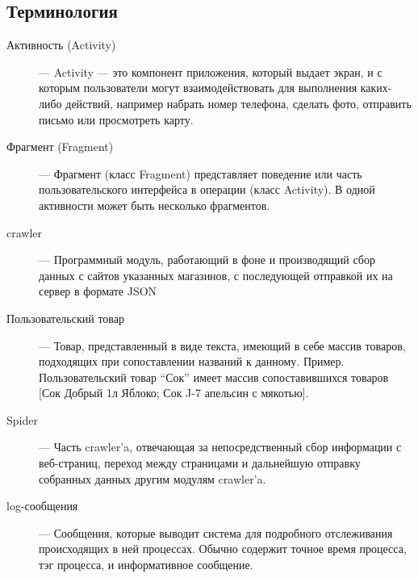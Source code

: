 \subsection{Терминология}
\begin{description}
    \item[Активность (Activity)] ---
        Activity — это компонент приложения, который выдает экран, и с которым
        пользователи могут взаимодействовать для выполнения каких-либо
        действий, например набрать номер телефона, сделать фото, отправить
        письмо или просмотреть карту. 

    \item[Фрагмент (Fragment)] ---
        Фрагмент (класс Fragment) представляет поведение или часть
        пользовательского интерфейса в операции (класс Activity). В одной
        активности может быть несколько фрагментов.

    \item[crawler] ---
            Программный модуль, работающий в фоне и производящий сбор данных с сайтов
            указанных магазинов, с последующей отправкой их на сервер в формате
            JSON

    \item[Пользовательский товар] ---
            Товар, представленный в виде текста, имеющий в себе массив товаров,
            подходящих при сопоставлении названий к данному. Пример.
            Пользовательский товар ``Сок'' имеет массив сопоставившихся товаров [Сок
            Добрый 1л Яблоко; Сок J-7 апельсин с мякотью].

    \item[Spider] ---
        Часть crawler'a, отвечающая за непосредственный сбор информации с
        веб-страниц, переход между страницами и дальнейшую отправку собранных
        данных другим модулям crawler'a.

    \item[log-сообщения] ---
        Сообщения, которые выводит система для подробного отслеживания
        происходящих в ней процессах. Обычно содержит точное время процесса,
        тэг процесса, и информативное сообщение.

\end{description}

